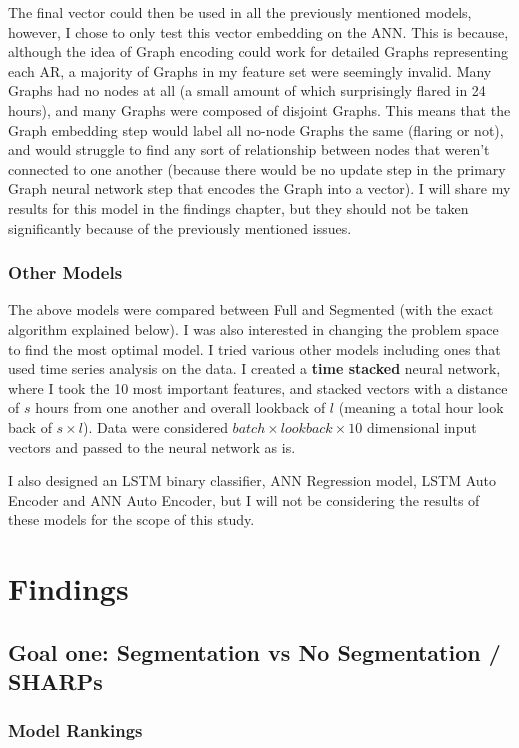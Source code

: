 \documentclass[defaultstyle,11pt]{thesis}
\begin{document}
The final vector could then be used in all the previously mentioned models, however, I chose to only test this vector embedding on the ANN. This is because, although the idea of Graph encoding could work for detailed Graphs representing each AR, a majority of Graphs in my feature set were seemingly invalid. Many Graphs had no nodes at all (a small amount of which surprisingly flared in 24 hours), and many Graphs were composed of disjoint Graphs. This means that the Graph embedding step would label all no-node Graphs the same (flaring or not), and would struggle to find any sort of relationship between nodes that weren't connected to one another (because there would be no update step in the primary Graph neural network step that encodes the Graph into a vector). I will share my results for this model in the findings chapter, but they should not be taken significantly because of the previously mentioned issues.


\subsection{Other Models}

The above models were compared between Full and Segmented (with the exact algorithm explained below). I was also interested in changing the problem space to find the most optimal model. I tried various other models including ones that used time series analysis on the data. I created a \textbf{time stacked} neural network, where I took the 10 most important features, and stacked vectors with a distance of $s$ hours from one another and overall lookback of $l$ (meaning a total hour look back of $s \times l$). Data were considered $batch \times lookback \times 10$ dimensional input vectors and passed to the neural network as is. 

I also designed an LSTM binary classifier, ANN Regression model, LSTM Auto Encoder and ANN Auto Encoder, but I will not be considering the results of these models for the scope of this study.

\chapter{Findings}

\section{Goal one: Segmentation vs No Segmentation / SHARPs}
\subsection{Model Rankings}
\end{document}
